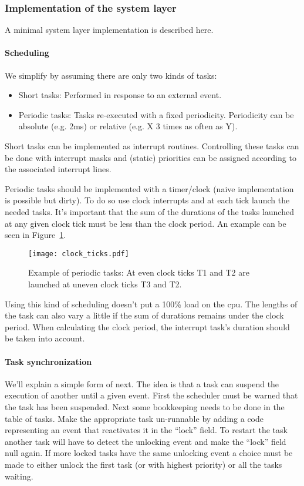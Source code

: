 \subsubsection{Implementation of the system layer}
A minimal  system layer implementation is described here.

\paragraph{Scheduling}
We simplify  by assuming there are only two kinds of tasks:
\begin{itemize}
	\item Short tasks: Performed in response to an external event.
	\item Periodic tasks: Tasks re-executed with a fixed periodicity. Periodicity can be absolute (e.g. 2ms) or relative (e.g. X 3 times as often as Y).
\end{itemize}

Short tasks can be implemented as interrupt routines. 
Controlling these tasks can be done with interrupt masks and (static) priorities can be assigned according to the associated interrupt lines.

Periodic tasks should be implemented with a timer/clock (naive implementation is possible but dirty).
To do so use clock interrupts and at each tick launch the needed tasks.
It's important that the sum of the durations of the tasks launched at any given clock tick must be less than the clock period. 
An example can be seen in Figure~\ref{f:perd_ex}.

\begin{figure}[H]
	\centering
	\texttt{[image: clock\_ticks.pdf]}
	\caption{Example of periodic tasks: At even clock ticks T1 and T2 are launched at uneven clock ticks T3 and T2.}
	\label{f:perd_ex}
\end{figure}

Using this kind of scheduling doesn't put a 100\% load on the cpu.
The lengths of the task can also vary a little if the sum of durations remains under the clock period.
When calculating the clock period, the interrupt task's duration should be taken into account.

\paragraph{Task synchronization}
We'll explain a simple form of  next. 
The idea is that a task can suspend the execution of another until a given event.
First the scheduler must be warned that the task has been suspended.
Next some bookkeeping needs to be done in the table of tasks.
Make the appropriate task un-runnable by adding a code representing an event that reactivates it in the ``lock'' field.
To restart the task another task will have to detect the unlocking event and make the ``lock'' field null again. 
If more locked tasks have the same unlocking event a choice must be made to either unlock the first task (or with highest priority) or all the tasks waiting. 

